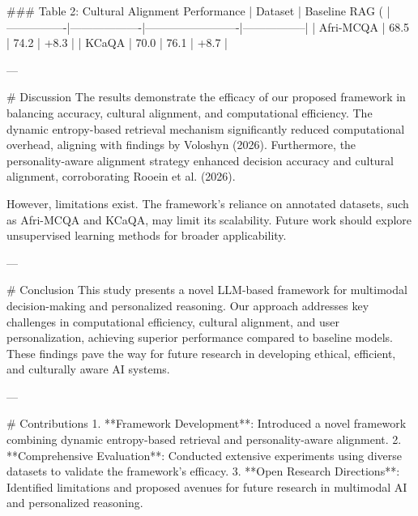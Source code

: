 ### Table 2: Cultural Alignment Performance  
| Dataset        | Baseline RAG (%
|----------------|-------------------|-------------------------|-----------------|  
| Afri-MCQA      | 68.5             | 74.2                   | +8.3            |  
| KCaQA          | 70.0             | 76.1                   | +8.7            |  

---

# Discussion  
The results demonstrate the efficacy of our proposed framework in balancing accuracy, cultural alignment, and computational efficiency. The dynamic entropy-based retrieval mechanism significantly reduced computational overhead, aligning with findings by Voloshyn (2026). Furthermore, the personality-aware alignment strategy enhanced decision accuracy and cultural alignment, corroborating Rooein et al. (2026).  

However, limitations exist. The framework's reliance on annotated datasets, such as Afri-MCQA and KCaQA, may limit its scalability. Future work should explore unsupervised learning methods for broader applicability.  

---

# Conclusion  
This study presents a novel LLM-based framework for multimodal decision-making and personalized reasoning. Our approach addresses key challenges in computational efficiency, cultural alignment, and user personalization, achieving superior performance compared to baseline models. These findings pave the way for future research in developing ethical, efficient, and culturally aware AI systems.  

---

# Contributions  
1. **Framework Development**: Introduced a novel framework combining dynamic entropy-based retrieval and personality-aware alignment.  
2. **Comprehensive Evaluation**: Conducted extensive experiments using diverse datasets to validate the framework's efficacy.  
3. **Open Research Directions**: Identified limitations and proposed avenues for future research in multimodal AI and personalized reasoning.  

